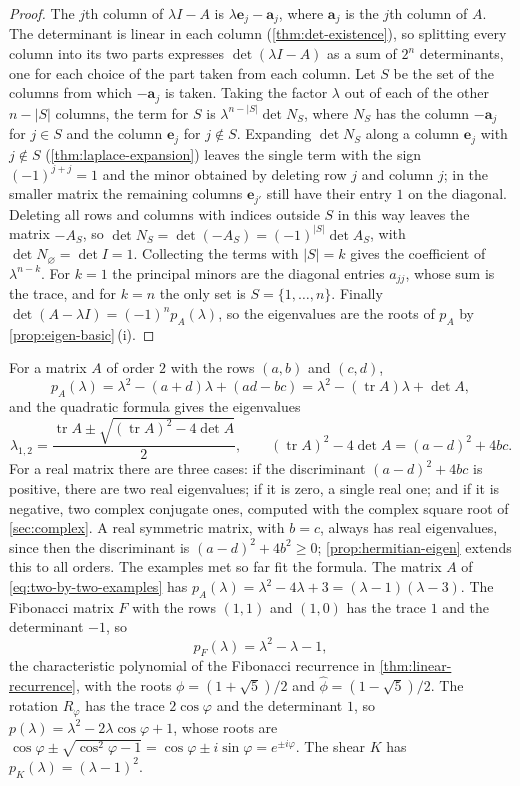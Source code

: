 \begin{proof}
The $j$th column of $\lambda I-A$ is $\lambda\mathbf e_j-\mathbf a_j$, where $\mathbf a_j$ is the $j$th column of $A$. The determinant is linear in each column (\cref{thm:det-existence}), so splitting every column into its two parts expresses $\det(\lambda I-A)$ as a sum of $2^n$ determinants, one for each choice of the part taken from each column. Let $S$ be the set of the columns from which $-\mathbf a_j$ is taken. Taking the factor $\lambda$ out of each of the other $n-|S|$ columns, the term for $S$ is $\lambda^{n-|S|}\det N_S$, where $N_S$ has the column $-\mathbf a_j$ for $j\in S$ and the column $\mathbf e_j$ for $j\notin S$. Expanding $\det N_S$ along a column $\mathbf e_j$ with $j\notin S$ (\cref{thm:laplace-expansion}) leaves the single term with the sign $(-1)^{j+j}=1$ and the minor obtained by deleting row $j$ and column $j$; in the smaller matrix the remaining columns $\mathbf e_{j'}$ still have their entry $1$ on the diagonal. Deleting all rows and columns with indices outside $S$ in this way leaves the matrix $-A_S$, so $\det N_S=\det(-A_S)=(-1)^{|S|}\det A_S$, with $\det N_\varnothing=\det I=1$. Collecting the terms with $|S|=k$ gives the coefficient of $\lambda^{n-k}$. For $k=1$ the principal minors are the diagonal entries $a_{jj}$, whose sum is the trace, and for $k=n$ the only set is $S=\{1,\ldots,n\}$. Finally $\det(A-\lambda I)=(-1)^np_A(\lambda)$, so the eigenvalues are the roots of $p_A$ by \cref{prop:eigen-basic}\,(i).
\end{proof}

For a matrix $A$ of order $2$ with the rows $(a,b)$ and $(c,d)$,
\[
p_A(\lambda)=\lambda^2-(a+d)\lambda+(ad-bc)=\lambda^2-(\operatorname{tr}A)\lambda+\det A ,
\]
and the quadratic formula gives the eigenvalues
\begin{equation}
\lambda_{1,2}=\frac{\operatorname{tr}A\pm\sqrt{(\operatorname{tr}A)^2-4\det A}}{2},\qquad(\operatorname{tr}A)^2-4\det A=(a-d)^2+4bc .
\label{eq:eigen-2x2}
\end{equation}
For a real matrix there are three cases: if the discriminant $(a-d)^2+4bc$ is positive, there are two real eigenvalues; if it is zero, a single real one; and if it is negative, two complex conjugate ones, computed with the complex square root of \cref{sec:complex}. A real symmetric matrix, with $b=c$, always has real eigenvalues, since then the discriminant is $(a-d)^2+4b^2\ge0$; \cref{prop:hermitian-eigen} extends this to all orders. The examples met so far fit the formula. The matrix $A$ of \eqref{eq:two-by-two-examples} has $p_A(\lambda)=\lambda^2-4\lambda+3=(\lambda-1)(\lambda-3)$. The Fibonacci matrix $F$ with the rows $(1,1)$ and $(1,0)$ has the trace $1$ and the determinant $-1$, so
\[
p_F(\lambda)=\lambda^2-\lambda-1,
\]
the characteristic polynomial of the Fibonacci recurrence in \cref{thm:linear-recurrence}, with the roots $\phi=(1+\sqrt5)/2$ and $\hat\phi=(1-\sqrt5)/2$. The rotation $R_\varphi$ has the trace $2\cos\varphi$ and the determinant $1$, so $p(\lambda)=\lambda^2-2\lambda\cos\varphi+1$, whose roots are $\cos\varphi\pm\sqrt{\cos^2\varphi-1}=\cos\varphi\pm i\sin\varphi=e^{\pm i\varphi}$. The shear $K$ has $p_K(\lambda)=(\lambda-1)^2$.

